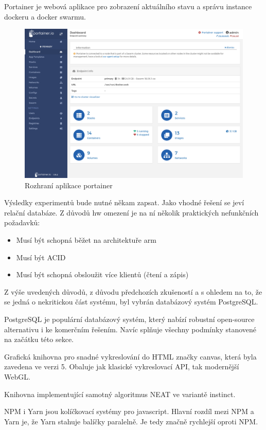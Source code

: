 Portainer je webová aplikace pro zobrazení aktuálního stavu a správu instance dockeru a docker swarmu.

\begin{figure}[H]
	\centering
	\includegraphics[width=0.7\linewidth]{portainer}
	\caption{Rozhraní aplikace portainer}
	\label{fig:portainer}
\end{figure}


Výsledky experimentů bude nutné někam zapsat. Jako vhodné řešení se jeví relační databáze. Z důvodů hw omezení je na ní několik praktických nefunkčních požadavků:
\begin{itemize}
	\item Musí být schopná běžet na architektuře arm
	\item Musí být ACID
	\item Musí být schopná obsloužit více klientů (čtení a zápis)
\end{itemize}

Z výše uvedených důvodů, z důvodu předchozích zkušeností a s ohledem na to, že se jedná o nekritickou část systému, byl vybrán databázový systém PostgreSQL. 

PostgreSQL je populární databázový systém, který nabízí robustní open-source alternativu i ke komerčním řešením. Navíc splňuje všechny podmínky stanovené na začátku této sekce.

Grafická knihovna pro snadné vykreslování do HTML značky canvas, která byla zavedena ve verzi 5. Obaluje jak klasické vykreslovací API, tak modernější WebGL.

Knihovna implementující samotný algoritmus NEAT ve variantě instinct.

NPM i Yarn jsou kolíčkovací systémy pro javascript. Hlavní rozdíl mezi NPM a Yarn je, že Yarn stahuje balíčky paralelně. Je tedy značně rychlejší oproti NPM. 

